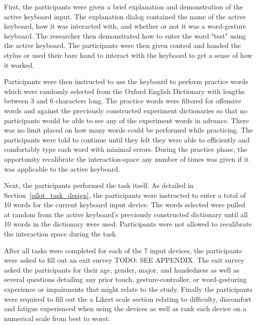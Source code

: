 First, the participants were given a brief explanation and demonstration of the active keyboard input. The explanation dialog contained the name of the active keyboard, how it was interacted with, and whether or not it was a word-gesture keyboard. The researcher then demonstrated how to enter the word "test" using the active keyboard. The participants were then given control and handed the stylus or used their bare hand to interact with the keyboard to get a sense of how it worked.

Participants were then instructed to use the keyboard to perform practice words which were randomly selected from the Oxford English Dictionary with lengths between 3 and 6 characters long. The practice words were filtered for offensive words and against the previously constructed experiment dictionaries so that no participants would be able to see any of the experiment words in advance. There was no limit placed on how many words could be performed while practicing. The participants were told to continue until they felt they were able to efficiently and comfortably type each word with minimal errors. During the practice phase, the opportunity recalibrate the interaction-space any number of times was given if it was applicable to the active keyboard.

Next, the participants performed the task itself. As detailed in Section~\ref{pilot_task_design}, the participants were instructed to enter a total of 10 words for the current keyboard input device. The words selected were pulled at random from the active keyboard's previously constructed dictionary until all 10 words in the dictionary were used. Participants were not allowed to recalibrate the interaction space during the task. 

After all tasks were completed for each of the 7 input devices, the participants were asked to fill out an exit survey TODO: SEE APPENDIX. The exit survey asked the participants for their age, gender, major, and handedness as well as several questions detailing any prior touch, gesture-controller, or word-gesturing experience or impairments that might relate to the study. Finally the participants were required to fill out the a Likert scale section relating to difficulty, discomfort and fatigue experienced when using the devices as well as rank each device on a numerical scale from best to worst.

